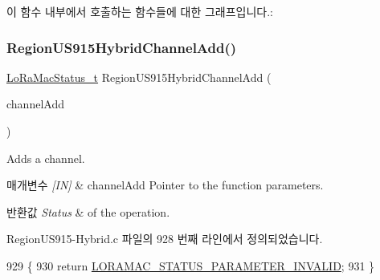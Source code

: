 이 함수 내부에서 호출하는 함수들에 대한 그래프입니다.\+:
\mbox{\label{group___r_e_g_i_o_n_u_s915_h_y_b_ga82fc4da7c52d7b26a8fcd8704c8af9ab}} 
\subsubsection{\texorpdfstring{Region\+U\+S915\+Hybrid\+Channel\+Add()}{RegionUS915HybridChannelAdd()}}
{\footnotesize\ttfamily \mbox{\hyperlink{group___l_o_r_a_m_a_c_ga30bd25657e10480f8605ee951b0ecfbd}{Lo\+Ra\+Mac\+Status\+\_\+t}} Region\+U\+S915\+Hybrid\+Channel\+Add (\begin{DoxyParamCaption}\item[{\mbox{\hyperlink{group___r_e_g_i_o_n_gab1c5f3aa06614283202906cef4417860}{Channel\+Add\+Params\+\_\+t}} $\ast$}]{channel\+Add }\end{DoxyParamCaption})}



Adds a channel. 


\begin{DoxyParams}{매개변수}
{\em \mbox{[}\+I\+N\mbox{]}} & channel\+Add Pointer to the function parameters.\\
\hline
\end{DoxyParams}

\begin{DoxyRetVals}{반환값}
{\em Status} & of the operation. \\
\hline
\end{DoxyRetVals}


Region\+U\+S915-\/\+Hybrid.\+c 파일의 928 번째 라인에서 정의되었습니다.


\begin{DoxyCode}
929 \{
930     \textcolor{keywordflow}{return} \mbox{\hyperlink{group___l_o_r_a_m_a_c_gga1d18f26b344040b3ec5c3db662919661ad0d3119f247d00e1787dda106fcb3017}{LORAMAC\_STATUS\_PARAMETER\_INVALID}};
931 \}
\end{DoxyCode}
\mbox{\label{group___r_e_g_i_o_n_u_s915_h_y_b_ga01abfdc17109559ec3375226baf72331}} 
